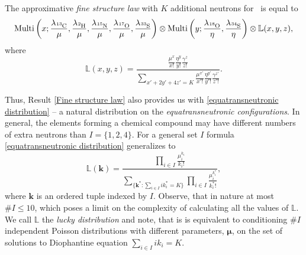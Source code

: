 \begin{result}\label{Fine structure law}
	The approximative \emph{fine structure law} with $K$ additional neutrons for \molecule\, is equal to 
	\begin{equation*}
	\mathrm{Multi} \left(
		x;
		\frac{ \lambda_\cem{^{13}C} }{ \mu }, 
		\frac{ \lambda_\cem{^{2} H} }{ \mu }, 
		\frac{ \lambda_\cem{^{15}N} }{ \mu },
		\frac{ \lambda_\cem{^{17}O} }{ \mu }, 
		\frac{ \lambda_\cem{^{33}S} }{  \mu} 
	\right ) \otimes
	\mathrm{Multi} \left(
		y;	
		\frac{ \lambda_\cem{^{18}O} }{ \eta },
		\frac{ \lambda_\cem{^{34}S} }{ \eta } 
	\right) \otimes 
	\mathbb{L}( x, y, z ),
\end{equation*}
	where 
	\begin{equation}\label{equatransneutronic distribution}
		\mathbb{L}( x, y , z) = 
		\frac{ \frac{ \mu^x }{ x! } \frac{ \eta^y}{ y! } \frac{ \gamma^z}{z!} }{ 
			\underset{ x' + 2 y' + 4 z' = K}{\sum} 
				\frac{ \mu^{x'} }{ x'! } 
				\frac{ \eta^{y'}}{ y'! } 
				\frac{ \gamma^{z'}}{z'!}
		}.
	\end{equation}
\end{result}
Thus, Result \ref{Fine structure law} also provides us with \eqref{equatransneutronic distribution} -- a natural distribution on the {\it equatransneutronic configurations}. In general, the elements forming a chemical compound may have different numbers of extra neutrons than $I = \{ 1, 2, 4\}$. For a general set $I$ formula \eqref{equatransneutronic distribution} generalizes to 
\begin{equation*}
	\mathbb{L}( \bm{k} ) = 
	\frac{ 
		\prod_{i \in I} \frac{ \mu_i^{k_i} }{ {k_i}! } 
	}{ 
		\underset{ \{ \bm{k}^* :  \sum_{i \in I} i k_i^*  = K \} }{\sum} 	
		\prod_{i \in I} \frac{ \mu_i^{k_i^*} }{ {k_i^*}! }	
	},
\end{equation*}
where $\bm{k}$ is an ordered tuple indexed by $I$. Observe, that in nature at most $\# I \leq 10$, which poses a limit on the complexity of calculating all the values of $\mathbb{L}$. We call $\mathbb{L}$ the {\it lucky distribution} and note, that is is equivalent to conditioning $\#I$ independent Poisson distributions with different parameters, $\bm{\mu}$, on the set of solutions to Diophantine equation $\sum_{i \in I} i k_i  = K$.